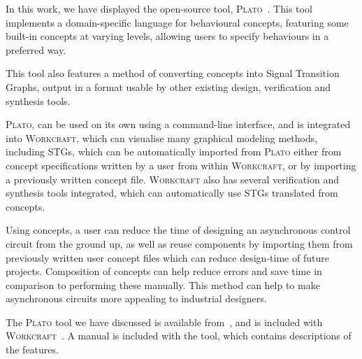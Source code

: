 \documentclass[british, 10pt, conference, compsocconf]{IEEEtran}
\newcommand{\noun}[1]{\textsc{#1}}
\begin{document}

In this work, we have displayed the open-source
tool, \noun{Plato}~\cite{2016_concepts_github}. This tool implements a 
domain-specific language for behavioural concepts, featuring some built-in 
concepts at varying levels, allowing users to specify behaviours in a preferred 
way. 

This tool also features a method of converting concepts into Signal
Transition Graphs, output in a format usable by other existing design, 
verification and synthesis tools. 

\noun{Plato}, can be used on its own using a command-line interface, and is
integrated into \noun{Workcraft}, which can visualise many graphical modeling
methods, including STGs, which can be automatically imported from \noun{Plato}
either from concept specifications written by a user from within 
\noun{Workcraft}, or by importing a previously written concept file.
\noun{Workcraft} also has several verification and synthesis tools 
integrated, which can automatically use STGs translated from concepts. 

Using concepts, a user can reduce the time of designing an asynchronous
control circuit from the ground up, as well as reuse components
by importing them from previously written user concept files which can reduce 
design-time of future projects. Composition of concepts can help
reduce errors and save time in comparison to performing these manually.
This method can help to make asynchronous circuits more appealing
to industrial designers.


The \noun{Plato} tool we have discussed is available 
from~\cite{2016_concepts_github}, and is included with 
\noun{Workcraft}~\cite{Workcraft_website}. A manual is included with the tool, 
which contains descriptions of the features. 




\end{document}
